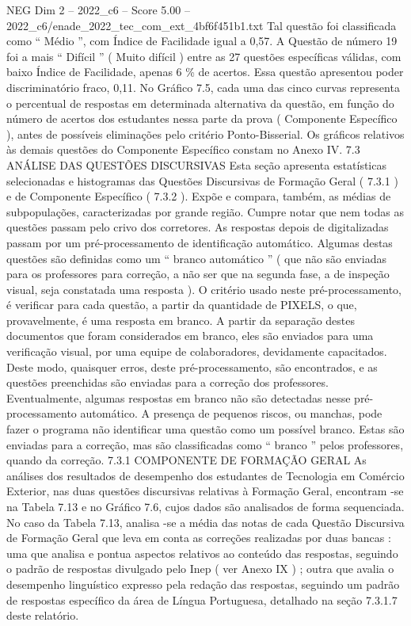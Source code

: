 \begin{textsample}{NEG Dim 2 – 2022\_c6 – Score 5.00 – 2022\_c6/enade\_2022\_tec\_com\_ext\_4bf6f451b1.txt}
Tal questão foi classificada como “ Médio ”, com Índice de Facilidade igual a 0,57.
A Questão de número 19 foi a mais “ Difícil ” ( Muito difícil ) entre as 27 questões específicas válidas, com baixo Índice de Facilidade, apenas 6 \% de acertos.
Essa questão apresentou poder discriminatório fraco, 0,11.
No Gráfico 7.5, cada uma das cinco curvas representa o percentual de respostas em determinada alternativa da questão, em função do número de acertos dos estudantes nessa parte da prova ( Componente Específico ), antes de possíveis eliminações pelo critério Ponto-Bisserial.
Os gráficos relativos às demais questões do Componente Específico constam no Anexo IV. 7.3 ANÁLISE DAS QUESTÕES DISCURSIVAS Esta seção apresenta estatísticas selecionadas e histogramas das Questões Discursivas de Formação Geral ( 7.3.1 ) e de Componente Específico ( 7.3.2 ).
Expõe e compara, também, as médias de subpopulações, caracterizadas por grande região.
Cumpre notar que nem todas as questões passam pelo crivo dos corretores.
As respostas depois de digitalizadas passam por um pré-processamento de identificação automático.
Algumas destas questões são definidas como um “ branco automático ” ( que não são enviadas para os professores para correção, a não ser que na segunda fase, a de inspeção visual, seja constatada uma resposta ).
O critério usado neste pré-processamento, é verificar para cada questão, a partir da quantidade de PIXELS, o que, provavelmente, é uma resposta em branco.
A partir da separação destes documentos que foram considerados em branco, eles são enviados para uma verificação visual, por uma equipe de colaboradores, devidamente capacitados.
Deste modo, quaisquer erros, deste pré-processamento, são encontrados, e as questões preenchidas são enviadas para a correção dos professores.
Eventualmente, algumas respostas em branco não são detectadas nesse pré-processamento automático.
A presença de pequenos riscos, ou manchas, pode fazer o programa não identificar uma questão como um possível branco.
Estas são enviadas para a correção, mas são classificadas como “ branco ” pelos professores, quando da correção. 7.3.1 COMPONENTE DE FORMAÇÃO GERAL As análises dos resultados de desempenho dos estudantes de Tecnologia em Comércio Exterior, nas duas questões discursivas relativas à Formação Geral, encontram -se na Tabela 7.13 e no Gráfico 7.6, cujos dados são analisados de forma sequenciada.
No caso da Tabela 7.13, analisa -se a média das notas de cada Questão Discursiva de Formação Geral que leva em conta as correções realizadas por duas bancas : uma que analisa e pontua aspectos relativos ao conteúdo das respostas, seguindo o padrão de respostas divulgado pelo Inep ( ver Anexo IX ) ; outra que avalia o desempenho linguístico expresso pela redação das respostas, seguindo um padrão de respostas específico da área de Língua Portuguesa, detalhado na seção 7.3.1.7 deste relatório.

\end{textsample}
